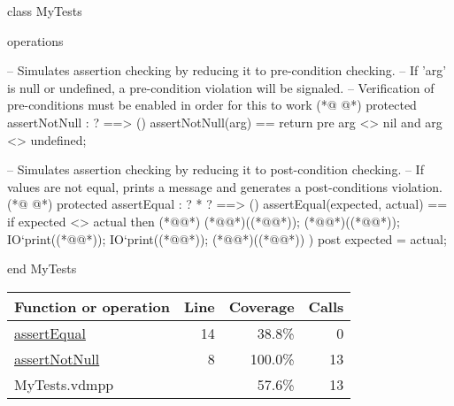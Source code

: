 \begin{vdmpp}[breaklines=true]
class MyTests

operations

  -- Simulates assertion checking by reducing it to pre-condition checking.
  -- If 'arg' is null or undefined, a pre-condition violation will be signaled.
  -- Verification of pre-conditions must be enabled in order for this to work
(*@
\label{assertNotNull:8}
@*)
  protected assertNotNull : ? ==> ()
  assertNotNull(arg) == return
  pre arg <> nil and arg <> undefined;

  -- Simulates assertion checking by reducing it to post-condition checking.
  -- If values are not equal, prints a message and generates a post-conditions violation.
(*@
\label{assertEqual:14}
@*)
  protected assertEqual : ? * ? ==> ()
  assertEqual(expected, actual) ==
    if expected <> actual then
    (*@\vdmnotcovered{(}@*)
      (*@@*)((*@@*));
      (*@@*)((*@@*));
      IO`print((*@@*));
      IO`print((*@@*));
      (*@@*)((*@@*))
    )
  post expected = actual;

end MyTests
\end{vdmpp}
\bigskip
\begin{longtable}{|l|r|r|r|}
\hline
Function or operation & Line & Coverage & Calls \\
\hline
\hline
\hyperref[assertEqual:14]{assertEqual} & 14&38.8\% & 0 \\
\hline
\hyperref[assertNotNull:8]{assertNotNull} & 8&100.0\% & 13 \\
\hline
\hline
MyTests.vdmpp & & 57.6\% & 13 \\
\hline
\end{longtable}


